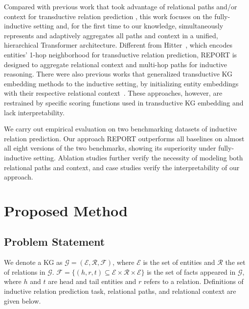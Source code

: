 \documentclass{article}
\begin{document}
Compared with previous work that took advantage of relational paths and/or context for transductive relation prediction \cite{ptranse,gake,pathcon}, this work focuses on the fully-inductive setting and, for the first time to our knowledge, simultaneously represents and adaptively aggregates all paths and context in a unified, hierarchical Transformer architecture. 
Different from Hitter~\cite{hitter}, which encodes entities' 1-hop neighborhood for transductive relation prediction, REPORT is designed to aggregate relational context and multi-hop paths for inductive reasoning.
There were also previous works that generalized transductive KG embedding methods to the inductive setting, by initializing entity embeddings with their respective relational context~\cite{nodepiece,morse}. These approaches, however, are restrained by specific scoring functions used in transductive KG embedding and lack interpretability.


We carry out empirical evaluation on two benchmarking datasets of inductive relation prediction. 
Our approach REPORT outperforms all baselines on almost all eight versions of the two benchmarks, showing its superiority under fully-inductive setting. Ablation studies further verify the necessity of modeling both relational paths and context, and case studies verify the interpretability of our approach.

\vspace{-0.05in}
\section{Proposed Method}
\vspace{-0.05in}
\subsection{Problem Statement}
We denote a KG as $\mathcal{G=(E,R,F)}$, where $\mathcal{E}$ is the set of entities and $\mathcal{R}$ the set of relations in $\mathcal{G}$. 
$\mathcal{F}=\{(h,r,t)\subseteq \mathcal{E\times R\times E}\}$ is the set of facts appeared in $\mathcal{G}$, where $h$ and $t$ are head and tail entities and $r$ refers to a relation. 
Definitions of inductive relation prediction task, relational paths, and relational context are given below.
\end{document}

